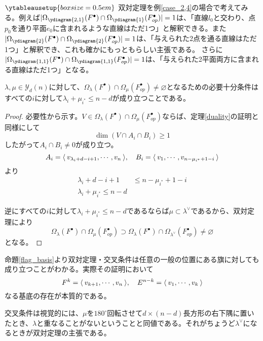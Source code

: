 \documentclass{ltjsreport}
\begin{document}
\begin{eg}
  $\ytableausetup{boxsize=0.5em}$
  双対定理を例\ref{case_2,4}の場合で考えてみる。例えば$|\Omega_{\ydiagram{2,1}}(F^\bullet)\cap\Omega_{\ydiagram{1}}(F^\bullet_{op})|=1$は、「直線$l_0$と交わり、点$p_0$を通り平面$e_0$に含まれるような直線はただ1つ」と解釈できる。また$|\Omega_{\ydiagram{2}}(F^\bullet)\cap\Omega_{\ydiagram{2}}(F^\bullet_{op})|=1$は、「与えられた2点を通る直線はただ1つ」と解釈でき、これも確かにもっともらしい主張である。 さらに$|\Omega_{\ydiagram{1,1}}(F^\bullet)\cap\Omega_{\ydiagram{1,1}}(F^\bullet_{op})|=1$は、「与えられた2平面両方に含まれる直線はただ1つ」となる。
\end{eg}

\begin{cor}[交叉条件]
  $\lambda,\mu\in\mathcal{Y}_d(n)$に対して、$\Omega_{\lambda}(F^\bullet)\cap\Omega_{\mu}(F^\bullet_{op})\neq\varnothing$となるための必要十分条件はすべての$i$に対して$\lambda_i+\mu_{i^*}\leq n-d$が成り立つことである。
\end{cor}

\begin{proof}
  必要性から示す。$V\in\Omega_\lambda(F^\bullet)\cap\Omega_{\mu}(F^\bullet_{op})$ならば、定理\ref{duality}の証明と同様にして
  \[
  \dim (V\cap A_i\cap B_i)\geq 1
  \]
  したがって$A_i\cap B_i\neq 0$が成り立つ。
  \[
  A_i=\langle\:v_{\lambda_i+d-i+1},\cdots,v_n\:\rangle,\quad B_i=\langle\:v_1,\cdots,v_{n-\mu_{i^*}+1-i}\:\rangle  
  \]
  より
  \begin{align*}
    \lambda_i+d-i+1&\leq n-\mu_{i^*}+1-i\\
    \lambda_i+\mu_{i^*}\leq n-d
  \end{align*}

  逆にすべての$i$に対して$\lambda_i+\mu_{i^*}\leq n-d$であるならば$\mu\subset \lambda^\vee$であるから、双対定理により
  \[
  \Omega_{\lambda}(F^\bullet)\cap\Omega_{\mu}(F^\bullet_{op})\supset \Omega_{\lambda}(F^\bullet)\cap\Omega_{\lambda^\vee}(F^\bullet_{op})\neq \varnothing  
  \]
  となる。
\end{proof}

命題\ref{flag_basis}より双対定理・交叉条件は任意の一般の位置にある旗に対しても成り立つことがわかる。実際その証明において
\[
  F^k=\langle\:v_{k+1},\cdots,v_n\:\rangle, \quad E^{n-k}=\langle\:v_1,\cdots,v_k\:\rangle  
\]
なる基底の存在が本質的である。

交叉条件は視覚的には、$\mu$を$180^\circ$回転させて$d\times (n-d)$長方形の右下隅に置いたとき、$\lambda$と重なることがないということと同値である。それがちょうど$\lambda^\vee$になるときが双対定理の主張である。
\end{document}
